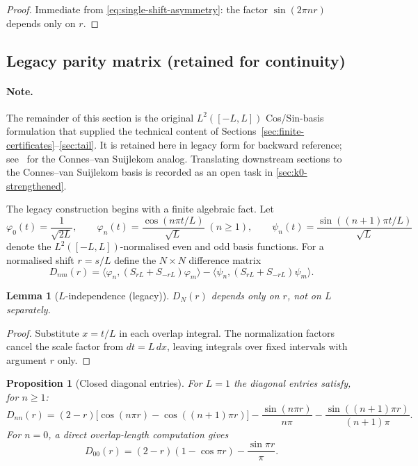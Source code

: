 \documentclass[11pt,a4paper]{article}
\newtheorem{lemma}[lemma]{Lemma}
\newtheorem{proposition}[proposition]{Proposition}
\theoremstyle{remark}
\theoremstyle{plain}
\begin{document}
\begin{proof}
Immediate from \eqref{eq:single-shift-asymmetry}: the factor
$\sin(2\pi n r)$ depends only on $r$.
\end{proof}

\subsection{Legacy parity matrix (retained for continuity)}
\label{subsec:parity-legacy}

\paragraph{Note.}  The remainder of this section is the original
$L^2([-L,L])$ Cos/Sin-basis formulation that supplied the technical
content of Sections~\ref{sec:finite-certificates}--\ref{sec:tail}.
It is retained here in legacy form for backward reference;
see~ for the Connes--van Suijlekom analog.
Translating downstream sections to the Connes--van Suijlekom basis
is recorded as an open task in \cref{sec:k0-strengthened}.

The legacy construction begins with a finite algebraic fact. Let
\[
  \varphi_0(t)=\frac{1}{\sqrt{2L}},
  \qquad
  \varphi_n(t)=\frac{\cos(n\pi t/L)}{\sqrt L}\;(n\geq 1),
  \qquad
  \psi_n(t)=\frac{\sin((n+1)\pi t/L)}{\sqrt L}
\]
denote the $L^2([-L,L])$-normalised even and odd basis functions. For a normalised shift $r=s/L$ define
the $N\times N$ difference matrix
\[
  D_{nm}(r)=
  \langle\varphi_n,(S_{rL}+S_{-rL})\varphi_m\rangle
  -
  \langle\psi_n,(S_{rL}+S_{-rL})\psi_m\rangle .
\]

\begin{lemma}[$L$-independence (legacy)]
\label{lem:L-independence}
$D_N(r)$ depends only on $r$, not on $L$ separately.
\end{lemma}

\begin{proof}
Substitute $x=t/L$ in each overlap integral. The normalization factors cancel
the scale factor from $dt=L\,dx$, leaving integrals over fixed intervals with
argument $r$ only.
\end{proof}

\begin{proposition}[Closed diagonal entries]
\label{prop:diagonal}
For $L=1$ the diagonal entries satisfy, for $n\geq 1$:
\[
  D_{nn}(r)
  =(2-r)\bigl[\cos(n\pi r)-\cos((n+1)\pi r)\bigr]
  -\frac{\sin(n\pi r)}{n\pi}
  -\frac{\sin((n+1)\pi r)}{(n+1)\pi}.
\]
For $n=0$, a direct overlap-length computation gives
\[
  D_{00}(r)=(2-r)(1-\cos\pi r)-\frac{\sin\pi r}{\pi}.
\]
\end{proposition}
\end{document}
